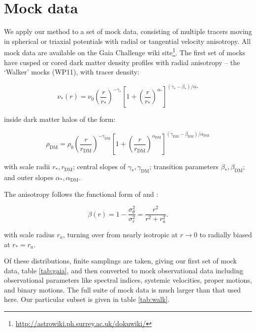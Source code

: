 \section{Mock data}\label{sec:mocks}

We apply our method to a set of mock data, consisting of multiple
tracers moving in spherical or triaxial potentials with radial or
tangential velocity anisotropy. All mock data are available on the
{\sc Gaia Challenge} wiki
site\footnote{\href{http://astrowiki.ph.surrey.ac.uk/dokuwiki/}{http://astrowiki.ph.surrey.ac.uk/dokuwiki/}}. The
first set of mocks have cusped or cored dark matter density profiles
with radial anisotropy -- the `Walker' mocks (WP11), with tracer
density:

\begin{equation}
    \nu_*(r) = \nu_0\left(\frac{r}{r_*}\right)^{-\gamma_*} \left[1+\left(\frac{r}{r_*}\right)^{\alpha_*}\right]^{(\gamma_*-\beta_*)/\alpha_*}
\end{equation}

inside dark matter halos of the form:

\begin{equation}
    \rho_{\text{DM}} = \rho_0\left(\frac{r}{r_{\text{DM}}}\right)^{-\gamma_{\text{DM}}}\left[1+\left(\frac{r}{r_{\text{DM}}}\right)^{\alpha_{\text{DM}}}\right]^{(\gamma_{\text{DM}}-\beta_{\text{DM}})/\alpha_{\text{DM}}}
\end{equation}

with scale radii $r_*, r_\text{DM}$; central slopes of
$\gamma_*, \gamma_{\text{DM}}$; transition parameters
$\beta_*,\beta_{\text{DM}}$; and outer slopes
$\alpha_*, \alpha_{\text{DM}}$.

The anisotropy follows the functional form of \citet{Osipkov1979} and
\citet{Merritt1985}:

\begin{equation}
    \beta(r)=1-\frac{\sigma_\theta^2}{\sigma_r^2} = \frac{r^2}{r^2+r_a^2}.
\end{equation}

with scale radius $r_a$, turning over from nearly isotropic at
$r\to 0$ to radially biased at $r_*=r_a$.

Of these distributions, finite samplings are taken, giving our first
set of mock data, table \ref{tab:gaia}, and then converted to mock
observational data including observational parameters like spectral
indices, systemic velocities, proper motions, and binary motions. The
full suite of mock data is much larger than that used here. Our
particular subset is given in table \ref{tab:walk}.

